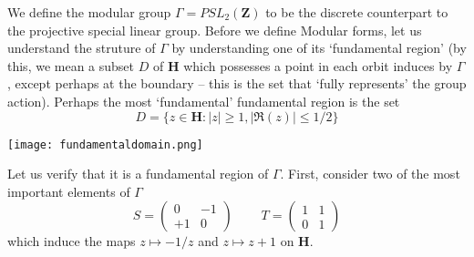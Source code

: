 We define the modular group $\Gamma = PSL_2(\mathbf{Z})$ to be the discrete counterpart to the projective special linear group. Before we define Modular forms, let us understand the struture of $\Gamma$ by understanding one of its `fundamental region' (by this, we mean a subset $D$ of $\mathbf{H}$ which possesses a point in each orbit induces by $\Gamma$, except perhaps at the boundary -- this is the set that `fully represents' the group action). Perhaps the most `fundamental' fundamental region is the set
%
\[ D = \{ z \in \mathbf{H} : |z| \geq 1, |\Re(z)| \leq 1/2 \} \]
%
\begin{center}
\texttt{[image: fundamentaldomain.png]}
\end{center}
%
Let us verify that it is a fundamental region of $\Gamma$. First, consider two of the most important elements of $\Gamma$
%
\[ S = \begin{pmatrix} 0 & -1 \\ +1 & 0 \end{pmatrix}\ \ \ \ \ \ \ \ \ \ T = \begin{pmatrix} 1 & 1 \\ 0 & 1 \end{pmatrix} \]
%
which induce the maps $z \mapsto -1/z$ and $z \mapsto z + 1$ on $\mathbf{H}$.

